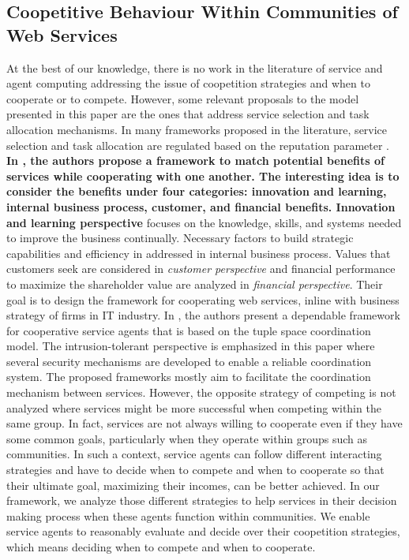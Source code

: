 \subsection{Coopetitive Behaviour Within Communities of Web Services}\label{sec:coopetetive}

At the best of our knowledge, there is no work in the literature
of service and agent computing addressing the issue of coopetition
strategies and when to cooperate or to compete. However, some
relevant proposals to the model presented in this paper are the
ones that address service selection and task allocation
mechanisms. In many frameworks proposed in the literature, service
selection and task allocation are regulated based on the
reputation parameter \cite{Bentahar,Rosario,Ruth,Yahyaoui}.
\textbf{In \cite{Huang}, the authors propose a framework to match potential
benefits of services while cooperating with one another. The
interesting idea is to consider the benefits under four
categories: innovation and learning, internal business process,
customer, and financial benefits.
Innovation and learning perspective} focuses on the knowledge, skills, and systems needed to improve the business continually. Necessary factors to build strategic capabilities and efficiency in addressed in internal business process. Values that customers seek are considered in \emph{customer perspective} and financial performance to maximize the shareholder value are analyzed in \emph{financial perspective}. Their goal is to design the framework for cooperating web services, inline with business strategy of firms in IT industry.
In \cite{Alchieri}, the authors
present a dependable framework for cooperative service agents that
is based on the tuple space coordination model. The
intrusion-tolerant perspective is emphasized in this paper where
several security mechanisms are developed to enable a reliable
coordination system. %
The proposed frameworks mostly aim to facilitate the coordination
mechanism between services. However, the opposite strategy of
competing is not analyzed where services might be more successful
when competing within the same group. In fact, services are not
always willing to cooperate even if they have some common goals,
particularly when they operate within groups such as communities.
In such a context, service agents can follow different interacting
strategies and have to decide when to compete and when to
cooperate so that their ultimate goal, maximizing their incomes,
can be better achieved. In our framework, we analyze those
different strategies to help services in their decision making
process when these
agents function within communities. %
We enable service agents to reasonably evaluate and decide over
their coopetition strategies, which means deciding when to compete
and when to cooperate.



